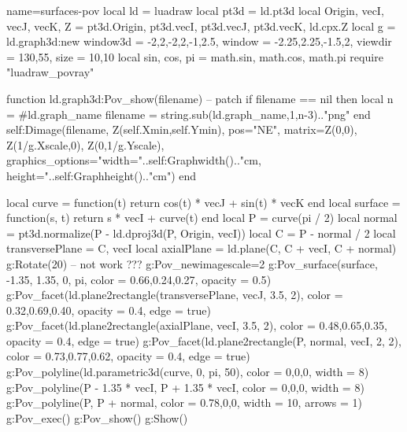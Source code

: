 \documentclass{standalone}
\begin{document}
    \begin{luadraw}{name=surfaces-pov}
    local ld = luadraw
    local pt3d = ld.pt3d
    local Origin, vecI, vecJ, vecK, Z = pt3d.Origin, pt3d.vecI, pt3d.vecJ, pt3d.vecK, ld.cpx.Z
    local g = ld.graph3d:new{
        window3d = {-2,2,-2,2,-1,2.5},
        window = {-2.25,2.25,-1.5,2},
        viewdir = {130,55},
        size = {10,10}
    }
    local sin, cos, pi = math.sin, math.cos, math.pi
    require "luadraw_povray"
    
    function ld.graph3d:Pov_show(filename) -- patch
        if filename == nil then
            local n = #ld.graph_name
            filename = string.sub(ld.graph_name,1,n-3).."png"
        end
        self:Dimage(filename, Z(self.Xmin,self.Ymin), 
            {pos="NE", matrix={Z(0,0), Z(1/g.Xscale,0), Z(0,1/g.Yscale)}, graphics_options="width="..self:Graphwidth().."cm, height="..self:Graphheight().."cm"})
    end
    
    local curve = function(t)
        return cos(t) * vecJ + sin(t) * vecK
    end
    local surface = function(s, t)
        return s * vecI + curve(t)
    end
    local P = curve(pi / 2)
    local normal = pt3d.normalize(P - ld.dproj3d(P, {Origin, vecI}))
    local C = P - normal / 2
    local transversePlane = {C, vecI}
    local axialPlane = ld.plane(C, C + vecI, C + normal)
    g:Rotate(20) -- not work ???    
    g:Pov_new{imagescale=2}
    g:Pov_surface(surface, -1.35, 1.35, 0, pi, {color = {0.66,0.24,0.27}, opacity = 0.5})
    g:Pov_facet(ld.plane2rectangle(transversePlane, vecJ, 3.5, 2), {color = {0.32,0.69,0.40}, opacity = 0.4, edge = true})
    g:Pov_facet(ld.plane2rectangle(axialPlane, vecI, 3.5, 2), {color = {0.48,0.65,0.35}, opacity = 0.4, edge = true})
    g:Pov_facet(ld.plane2rectangle({P, normal}, vecI, 2, 2), {color = {0.73,0.77,0.62}, opacity = 0.4, edge = true})
    g:Pov_polyline(ld.parametric3d(curve, 0, pi, 50), {color = {0,0,0}, width = 8})
    g:Pov_polyline({P - 1.35 * vecI, P + 1.35 * vecI}, {color = {0,0,0}, width = 8})
    g:Pov_polyline({P, P + normal}, {color = {0.78,0,0}, width = 10, arrows = 1})
    g:Pov_exec()
    g:Pov_show()
    g:Show()
    \end{luadraw}
\end{document}
